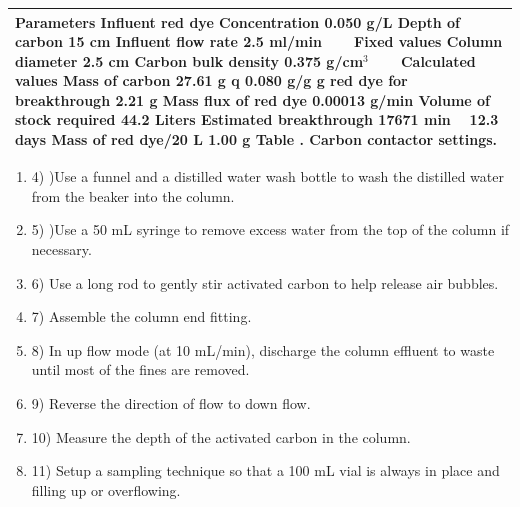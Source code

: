 \documentclass{article} %
\begin{document}
\begin{tabular}{|p{2.1in}|} \hline 
\newline Parameters \newline Influent red dye Concentration        0.050  g/L \newline Depth of carbon 15 cm \newline Influent flow rate 2.5 ml/min \newline ~  ~ \newline Fixed values \newline Column diameter 2.5 cm \newline Carbon bulk density 0.375 g/cm${}^{3}$ \newline ~  ~ \newline Calculated values \newline Mass of carbon 27.61 g \newline q        0.080  g/g \newline g red dye for breakthrough          2.21  g \newline Mass flux of red dye    0.00013  g/min \newline Volume of stock required 44.2 Liters \newline Estimated breakthrough 17671 min \newline ~ 12.3 days \newline Mass of red dye/20 L 1.00 g \newline Table \label{ZEqnNum743744}. Carbon contactor settings. \\ \hline 
\end{tabular}

\begin{enumerate}
\item 4) )Use a funnel and a distilled water wash bottle to wash the distilled water from the beaker into the column.

\noindent \item 5) )Use a 50 mL syringe to remove excess water from the top of the column if necessary.

\noindent \item 6) Use a long rod to gently stir activated carbon to help release air bubbles. 

\noindent \item 7) Assemble the column end fitting. 

\noindent \item 8) In up flow mode (at 10 mL/min), discharge the column effluent to waste until most of the fines are removed. 

\noindent \item 9) Reverse the direction of flow to down flow.

\noindent \item 10) Measure the depth of the activated carbon in the column.

\noindent \item 11) Setup a sampling technique so that a 100 mL vial is always in place and filling up or overflowing.
\end{enumerate}
\end{document}
